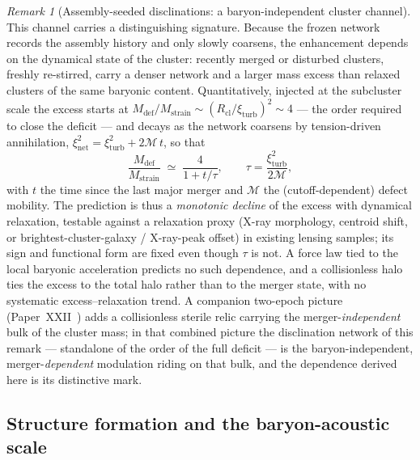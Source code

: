 \documentclass[11pt,a4paper]{article}
\theoremstyle{definition}
\theoremstyle{remark}
\newtheorem{remark}[theorem]{Remark}
\begin{document}
\begin{remark}[Assembly-seeded disclinations: a baryon-independent cluster channel]
This channel carries a distinguishing signature.  Because the frozen network
records the assembly history and only slowly coarsens, the enhancement
depends on the dynamical state of the cluster: recently merged or disturbed
clusters, freshly re-stirred, carry a denser network and a larger mass
excess than relaxed clusters of the same baryonic content.  Quantitatively,
injected at the subcluster scale the excess starts at
$M_{\mathrm{def}}/M_{\mathrm{strain}}\sim(R_{\mathrm{cl}}/\xi_{\mathrm{turb}})^2\sim4$
--- the order required to close the deficit --- and decays as the network
coarsens by tension-driven annihilation,
$\xi_{\mathrm{net}}^2=\xi_{\mathrm{turb}}^2+2\mathcal{M}\,t$, so that
\begin{equation}
  \frac{M_{\mathrm{def}}}{M_{\mathrm{strain}}}\;\simeq\;\frac{4}{1+t/\tau},
  \qquad \tau=\frac{\xi_{\mathrm{turb}}^2}{2\mathcal{M}},
  \label{P7:eq:merger_excess}
\end{equation}
with $t$ the time since the last major merger and $\mathcal{M}$ the
(cutoff-dependent) defect mobility.  The prediction is thus a \emph{monotonic
decline} of the excess with dynamical relaxation, testable against a
relaxation proxy (X-ray morphology, centroid shift, or brightest-cluster-galaxy
/ X-ray-peak offset) in existing lensing samples; its sign and functional form
are fixed even though $\tau$ is not.  A force law tied
to the local baryonic acceleration predicts no such dependence, and a
collisionless halo ties the excess to the total halo rather than to the merger
state, with no systematic excess--relaxation trend.
A companion two-epoch picture (Paper~XXII~\cite{Paper22}) adds a collisionless
sterile relic carrying the merger-\emph{independent} bulk of the cluster mass;
in that combined picture the disclination network of this remark --- standalone
of the order of the full deficit --- is the baryon-independent,
merger-\emph{dependent} modulation riding on that bulk, and the dependence
derived here is its distinctive mark.
\end{remark}

\subsection{Structure formation and the baryon-acoustic scale}
\label{P7:sec:bao}
\end{document}
